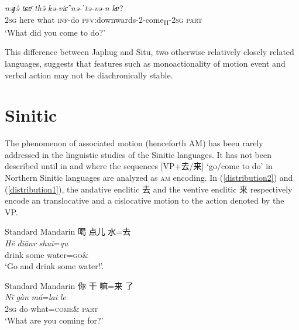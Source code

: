 \documentclass[oneside,a4paper,11pt]{article}
\newcommand{\ipa}[1]{{\phon\textit{#1}}}
\newcommand{\zh}[1]{{\cn #1}}
\newcommand{\sens}[1]{‘#1’}
\begin{document}
\begin{exe}
\ex \label{ex:nEtEvEn}
\gll
\ipa{nəɟə̂} \ipa{tɕɐ̄} \ipa{thə̂} \ipa{kə-viɛ̂} \ipa{nə-ˈtə-və-n} \ipa{kɐ}? \\
\textsc{2sg} here what \textsc{inf}-do \textsc{pfv}:downwards-2-come\textsubscript{II}-\textsc{2sg} \textsc{part} \\
\glt  \sens{What did you come to do?}
\end{exe}

This difference between Japhug and Situ, two otherwise relatively closely related languages, suggests that features such as monoactionality of motion event and verbal action may not be diachronically stable.


\section{Sinitic}
The phenomenon of associated motion (henceforth AM) has been rarely addressed in the linguistic studies of the Sinitic languages. It has not been described until in \cite{lamarre17motion.cum} and \cite{lamarre17deictic} where the sequences [VP+\zh{去/来}] \sens{go/come to do} in Northern Sinitic languages are analyzed as \textsc{am} encoding. In (\ref{distribution2}) and (\ref{distribution1}), the andative enclitic \zh{去} and the ventive enclitic \zh{来} respectively encode an translocative and a cislocative motion to the action denoted by the VP.


\begin{exe}
\ex Standard Mandarin \citep{lamarre17deictic} \label{distribution2}
\glll
\zh{喝} \zh{点儿} \zh{水}=\zh{去} \\
\ipa{Hē} \ipa{diǎnr} \ipa{shuǐ}=\ipa{qu} \\
drink  some water=\textsc{go}$\&$ \\
\glt \sens{Go and drink some water!}.
\end{exe}

\begin{exe}
\ex Standard Mandarin \citep{lamarre17motion.cum} \label{distribution1}
\glll
\zh{你} \zh{干} \zh{嘛}=\zh{来} \zh{了} \\
\ipa{Nǐ} \ipa{gàn} \ipa{má}=\ipa{lai} \ipa{le} \\
\textsc{2sg} do what=\textsc{come}$\&$ \textsc{part} \\
\glt \sens{What are you coming for?}
\end{exe}
\end{document}
